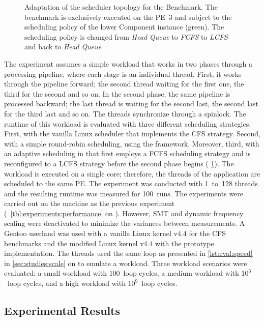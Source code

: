 \begin{figure}[!b] \centering
	\caption[Adaptation of the scheduler topology for the Benchmark.]{Adaptation of the scheduler topology for the Benchmark. The benchmark is exclusively executed on the PE~3 and subject to the scheduling policy of the lower Component instance (green). The scheduling policy is changed from \emph{Head Queue} to \emph{FCFS} to \emph{LCFS} and back to \emph{Head Queue}}%
	\label{fig:eval:speed-topo}
\end{figure}

The experiment assumes a simple workload that works in two phases through a processing pipeline, where each stage is an individual thread. First, it works through the pipeline forward; the second thread waiting for the first one, the third for the second and so on. In the second phase, the same pipeline is processed backward; the last thread is waiting for the second last, the second last for the third last and so on. The threads synchronize through a spinlock. The runtime of this workload is evaluated with three different scheduling strategies. First, with the vanilla Linux scheduler that implements the \ac{CFS} strategy. Second, with a simple round-robin scheduling, using the \cobas{} framework. Moreover, third, with an adaptive scheduling in \cobas{} that first employs a \ac{FCFS} scheduling strategy and is reconfigured to a \ac{LCFS} strategy before the second phase begins (\cf{} \cref{fig:eval:speed-topo}). The workload is executed on a single core; therefore, the threads of the application are scheduled to the same \ac{PE}. The experiment was conducted with 1~to~128 threads and the resulting runtime was measured for 100~runs. The experiments were carried out on the machine as the previous experiment (\cf{}~\cref{tbl:experiments:performance} on ). However, \ac{SMT} and dynamic frequency scaling were deactivated to minimize the variances between measurements. A Gentoo userland was used with a vanilla Linux kernel v4.4 for the \ac{CFS} benchmarks and the modified Linux kernel v4.4 with the \cobas{} prototype implementation. The threads used the same loop as presented in \cref{lst:eval:speed} in \cref{sec:studies:scale} on  to emulate a workload. Three workload scenarios were evaluated: a small workload with \(100\)~loop cycles, a medium workload with \(10^6\)~loop cycles, and a high workload with \(10^9\)~loop cycles.

\subsection{Experimental Results}%
\label{sec:studies:performance:results}

